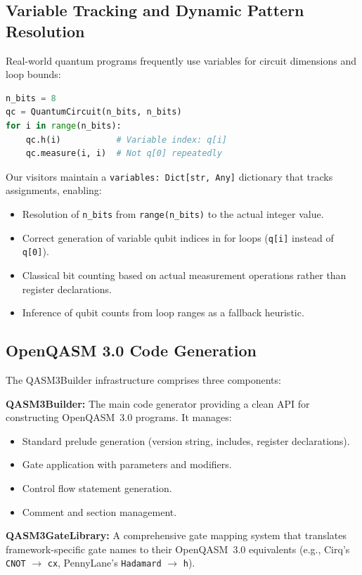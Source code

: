 \documentclass[conference]{IEEEtran}
\begin{document}
\subsection{Variable Tracking and Dynamic Pattern Resolution}

Real-world quantum programs frequently use variables for circuit dimensions and loop bounds:
\begin{lstlisting}[language=Python, caption={Dynamic pattern example}]
n_bits = 8
qc = QuantumCircuit(n_bits, n_bits)
for i in range(n_bits):
    qc.h(i)           # Variable index: q[i]
    qc.measure(i, i)  # Not q[0] repeatedly
\end{lstlisting}

Our visitors maintain a \texttt{variables: Dict[str, Any]} dictionary that tracks assignments, enabling:
\begin{itemize}
    \item Resolution of \texttt{n\_bits} from \texttt{range(n\_bits)} to the actual integer value.
    \item Correct generation of variable qubit indices in for loops (\texttt{q[i]} instead of \texttt{q[0]}).
    \item Classical bit counting based on actual measurement operations rather than register declarations.
    \item Inference of qubit counts from loop ranges as a fallback heuristic.
\end{itemize}

\subsection{OpenQASM 3.0 Code Generation}

The QASM3Builder infrastructure comprises three components:

\textbf{QASM3Builder:} The main code generator providing a clean API for constructing OpenQASM~3.0 programs. It manages:
\begin{itemize}
    \item Standard prelude generation (version string, includes, register declarations).
    \item Gate application with parameters and modifiers.
    \item Control flow statement generation.
    \item Comment and section management.
\end{itemize}

\textbf{QASM3GateLibrary:} A comprehensive gate mapping system that translates framework-specific gate names to their OpenQASM~3.0 equivalents (e.g., Cirq's \texttt{CNOT} $\rightarrow$ \texttt{cx}, PennyLane's \texttt{Hadamard} $\rightarrow$ \texttt{h}).
\end{document}
